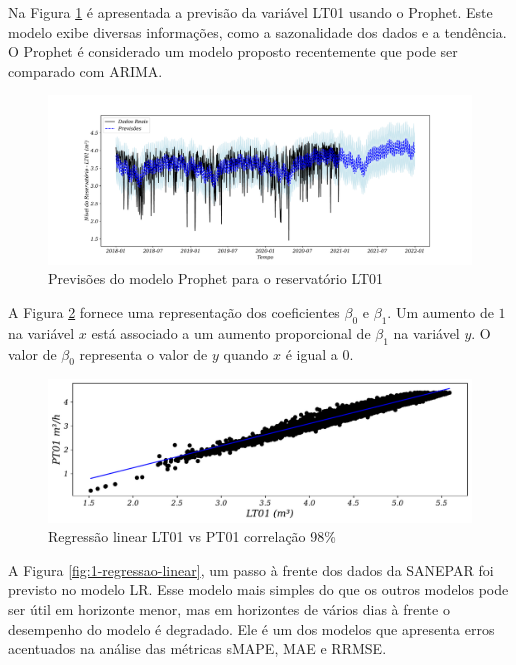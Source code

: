 Na Figura \ref{fig:prophet1} é apresentada a previsão da variável LT01 usando o Prophet. Este modelo exibe diversas informações, como a sazonalidade dos dados e a tendência. O Prophet é considerado um modelo proposto recentemente que pode ser comparado com ARIMA. 

\begin{figure}[H]
	\centering
	\caption{Previsões do modelo Prophet para o reservatório LT01}\label{fig:prophet1}
	\includegraphics[width=1\linewidth]{Apendices/Figuras/modelagem-24h/prophet1}
	
	
\end{figure}

A Figura \ref{fig:lr-lt01-m3} fornece uma representação dos coeficientes $\beta_0$ e $\beta_1$. Um aumento de $1$ na variável $x$ está associado a um aumento proporcional de $\beta_1$ na variável $y$. O valor de $\beta_0$ representa o valor de $y$ quando $x$ é igual a $0$.

\begin{figure}[H]
	\centering
	\caption{Regressão linear LT01 vs PT01 correlação 98\%}
	\label{fig:lr-lt01-m3}
	\includegraphics[width=1\linewidth]{"Modelos/Figuras/LR LT01 (m³)"}
	
	
\end{figure}

A Figura \ref{fig:1-regressao-linear}, um passo à frente dos dados da SANEPAR foi previsto no modelo LR. Esse modelo mais simples do que os outros modelos pode ser útil em horizonte menor, mas em horizontes de vários dias à frente o desempenho do modelo é degradado. Ele é um dos modelos que apresenta erros acentuados na análise das métricas sMAPE, MAE e RRMSE.

